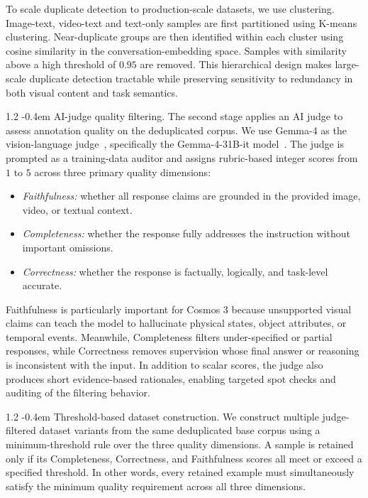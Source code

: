 \documentclass{llmxive}
\makeatletter
\providecommand{\paragraph}{  \@startsection{paragraph}{4}{\z@}    {1\baselineskip \@plus .2\baselineskip}    {-0.4em}    {\normalfont\normalsize\bfseries}}
\makeatother
\begin{document}
To scale duplicate detection to production-scale datasets, we use clustering. Image-text, video-text and text-only samples are first partitioned using K-means clustering. Near-duplicate groups are then identified within each cluster using cosine similarity in the conversation-embedding space. Samples with similarity above a high threshold of $0.95$ are removed. This hierarchical design makes large-scale duplicate detection tractable while preserving sensitivity to redundancy in both visual content and task semantics.

\paragraph{AI-judge quality filtering.}
The second stage applies an AI judge to assess annotation quality on the deduplicated corpus. We use Gemma-4 as the vision-language judge~\citep{gemma4modelcard}, specifically the Gemma-4-31B-it model~\citep{gemma4hf31bit}. The judge is prompted as a training-data auditor and assigns rubric-based integer scores from $1$ to $5$ across three primary quality dimensions:

\begin{itemize}
    \item \textit{Faithfulness:} whether all response claims are grounded in the provided image, video, or textual context.
    \item \textit{Completeness:} whether the response fully addresses the instruction without important omissions.
    \item \textit{Correctness:} whether the response is factually, logically, and task-level accurate.
\end{itemize}

Faithfulness is particularly important for Cosmos 3 because unsupported visual claims can teach the model to hallucinate physical states, object attributes, or temporal events. Meanwhile, Completeness filters under-specified or partial responses, while Correctness removes supervision whose final answer or reasoning is inconsistent with the input. In addition to scalar scores, the judge also produces short evidence-based rationales, enabling targeted spot checks and auditing of the filtering behavior.

\paragraph{Threshold-based dataset construction.}
We construct multiple judge-filtered dataset variants from the same deduplicated base corpus using a minimum-threshold rule over the three quality dimensions. A sample is retained only if its Completeness, Correctness, and Faithfulness scores all meet or exceed a specified threshold. In other words, every retained example must simultaneously satisfy the minimum quality requirement across all three dimensions.
\end{document}
